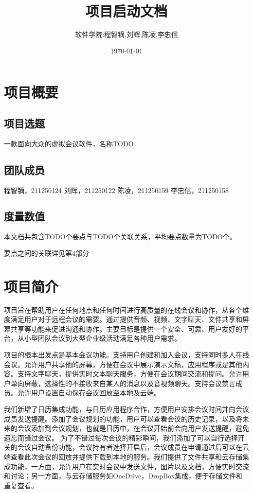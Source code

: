 \documentclass[a4paper,12pt]{article}
\title{项目启动文档}
\author{软件学院:程智镝,刘辉,陈凌,李忠信}
\date{\today}
\begin{document}
\maketitle

\tableofcontents

\section{项目概要}

\subsection{项目选题}
一款面向大众的虚拟会议软件，名称TODO
\subsection{团队成员}
程智镝，211250124
刘辉，211250122
陈凌，211250159
李忠信，211250158
\subsection{度量数值}
本文档共包含TODO个要点与TODO个关联关系，平均要点数量为TODO个。

要点之间的关联详见第4部分
\tableofcontents
\section{项目简介}
项目旨在帮助用户在任何地点和任何时间进行高质量的在线会议和协作，从各个维度满足用户对于远程会议的需要。通过提供音频、视频、文字聊天、文件共享和屏幕共享等功能来促进沟通和协作。主要目标是提供一个安全、可靠、用户友好的平台，从小型团队会议到大型企业级活动满足各种用户需求。

项目的根本出发点是基本会议功能。支持用户创建和加入会议，支持同时多人在线会议。允许用户共享他的屏幕，方便在会议中展示演示文稿，应用程序或是其他内容。支持文字聊天，提供实时文本聊天服务，方便在会议期间交流和提问。允许用户单向屏蔽，选择性的不接收来自某人的消息以及音视频聊天。支持会议禁言成员。允许用户设置自动保存会议回放至本地及云端。

我们新增了日历集成功能，与日历应用程序合作，方便用户安排会议时间并向会议成员发送提醒。添加了会议规划的功能，用户可以查看会议的历史记录，以及将未来的会议添加到会议规划，也就是日历中，在会议开始前会向用户发送提醒，避免遗忘而错过会议。
为了不错过每次会议的精彩瞬间，我们添加了可以自行选择开关的会议自动备份功能，会议持有者选择开启后，会议成员在申请通过后可以在云端查看此次会议的回放并提供下载到本地的服务。我们提供了文件共享和云存储集成功能，一方面，允许用户在实时会议中发送文件，图片以及文档，方便实时交流和讨论；另一方面，与云存储服务如OneDrive，DropBox集成，便于存储文件和重复查看。
\end{document}
